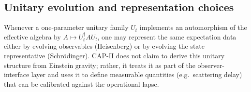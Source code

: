 \subsection{Unitary evolution and representation choices}
\label{subsec:unitary_representation}

Whenever a one-parameter unitary family $U_t$ implements an automorphism of the effective algebra by $A\mapsto U_t^\dagger A U_t$, one may represent the same expectation data either by evolving observables (Heisenberg) or by evolving the state representative (Schr\"odinger).
CAP-II does not claim to derive this unitary structure from Einstein gravity; rather, it treats it as part of the observer-interface layer and uses it to define measurable quantities (e.g.\ scattering delay) that can be calibrated against the operational lapse.


